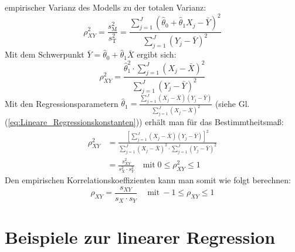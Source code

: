 empirischer Varianz des Modells zu der totalen Varianz:
\[
\rho_{XY}^2 = \frac{s_{\mathrm{M}}^2}{s_{\mathrm{T}}^2} = \frac{\sum\limits_{j = 1}^J {(\hat{\theta}_0 + \hat{\theta}_1 X_j - \bar {Y})^2} }{\sum\limits_{j = 1}^J {(Y_j - \bar{Y})^2} }
\]
Mit dem Schwerpunkt $\bar {Y} = \hat{\theta}_0 + \hat{\theta}_1 \bar {X}$ ergibt sich:
\[
\rho_{XY}^2 = \frac{\hat{\theta}_1^2 \cdot \sum\limits_{j = 1}^J 
	{(X_j - \bar X)^2} }{\sum\limits_{j = 1}^J {(Y_j - \bar {Y})^2} }
\]
Mit den Regressionsparametern $\hat{\theta}_1 = \frac{\sum\limits_{j =
		1}^J {(X_j - \bar {X})(Y_j - \bar {Y})} }{\sum\limits_{j = 1}^J {(X_j
		- \bar {X})^2} }$ (siehe Gl.(\ref{eq:Lineare_Regressionskonstanten})) erhält man für das 
Bestimmtheitsmaß:
\begin{align}
\rho_{XY}^2 &= \frac{\left[ {\sum\limits_{j = 1}^J {(X_j - \bar {X})(Y_j - \bar{Y})} } \right]^2}{\sum\limits_{j = 1}^J {(X_j - \bar {X})^2}
	\cdot
	\sum\limits_{j = 1}^J {(Y_j - \bar {Y})^2} } \nonumber \\[2ex]
&= \frac{s_{XY} ^2}{s_X ^2 \cdot s_Y ^2} \quad \textrm{mit}\; 
0 \le \rho_{XY}^2 \le 1 
\end{align} 
Den empirischen Korrelationskoeffizienten kann man somit wie folgt
berechnen:
\begin{equation}
\rho_{XY} = \frac{ s_{XY} }{ s_X \cdot s_Y } \quad \mathrm{~mit~}  - 1 \le \rho_{XY} \le 1
\end{equation}
\newpage
\section{Beispiele zur linearer Regression}
\label{Vorl2Regressionsaufg2}
